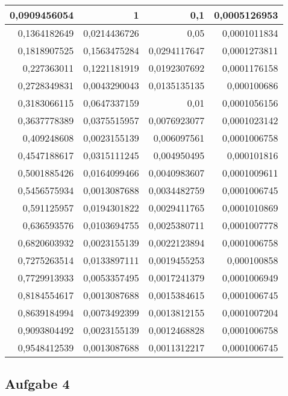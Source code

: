 \documentclass[12pt]{scrartcl}
\begin{document}
\begin{table}[htbp]
\begin{center}
\begin{tabular}{|r|r|r|r|}
0,0909456054 & 1 & 0,1 & 0,0005126953 \\ \hline
0,1364182649 & 0,0214436726 & 0,05 & 0,0001011834 \\ \hline
0,1818907525 & 0,1563475284 & 0,0294117647 & 0,0001273811 \\ \hline
0,227363011 & 0,1221181919 & 0,0192307692 & 0,0001176158 \\ \hline
0,2728349831 & 0,0043290043 & 0,0135135135 & 0,000100686 \\ \hline
0,3183066115 & 0,0647337159 & 0,01 & 0,0001056156 \\ \hline
0,3637778389 & 0,0375515957 & 0,0076923077 & 0,0001023142 \\ \hline
0,409248608 & 0,0023155139 & 0,006097561 & 0,0001006758 \\ \hline
0,4547188617 & 0,0315111245 & 0,004950495 & 0,000101816 \\ \hline
0,5001885426 & 0,0164099466 & 0,0040983607 & 0,0001009611 \\ \hline
0,5456575934 & 0,0013087688 & 0,0034482759 & 0,0001006745 \\ \hline
0,591125957 & 0,0194301822 & 0,0029411765 & 0,0001010869 \\ \hline
0,636593576 & 0,0103694755 & 0,0025380711 & 0,0001007778 \\ \hline
0,6820603932 & 0,0023155139 & 0,0022123894 & 0,0001006758 \\ \hline
0,7275263514 & 0,0133897111 & 0,0019455253 & 0,000100858 \\ \hline
0,7729913933 & 0,0053357495 & 0,0017241379 & 0,0001006949 \\ \hline
0,8184554617 & 0,0013087688 & 0,0015384615 & 0,0001006745 \\ \hline
0,8639184994 & 0,0073492399 & 0,0013812155 & 0,0001007204 \\ \hline
0,9093804492 & 0,0023155139 & 0,0012468828 & 0,0001006758 \\ \hline
0,9548412539 & 0,0013087688 & 0,0011312217 & 0,0001006745 \\ \hline
\end{tabular}
\end{center}
\label{tab:a_3_m}
\end{table}


\subsection{Aufgabe 4}
\end{document}
